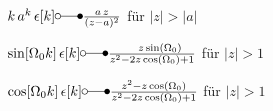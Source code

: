 \documentclass[11pt,a4paper,DIV=12]{scrartcl}
\begin{document}
\noindent $k \, a^k \, \epsilon[k] \laplace \frac{a \, z}{(z-a)^2}$  für $|z| > |a|$

\noindent $\sin[\Omega_0 k] \, \epsilon[k] \laplace \frac{\quad\, z\sin(\Omega_0)}{z^2 -2z \cos(\Omega_0) +1}$ für $|z| > 1$

\noindent $\cos[\Omega_0 k] \, \epsilon[k] \laplace \frac{z^2-z\cos(\Omega_0)}{z^2 -2z \cos(\Omega_0) +1}$ für $|z| > 1$



\clearpage

\end{document}
